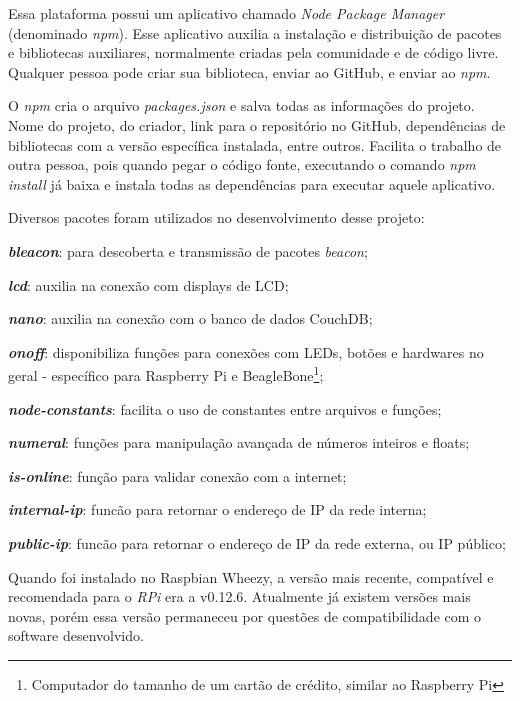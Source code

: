 \documentclass[
		12pt,				%
		openright,			%
		oneside,			%
		a4paper,			%
		chapter=TITLE,		%
		english,			%
		brazil				%
	]{abntex2}
\begin{document}
Essa plataforma possui um aplicativo chamado \textit{Node Package Manager} (denominado \textit{npm}). Esse aplicativo auxilia a instalação e distribuição de pacotes e bibliotecas auxiliares, normalmente criadas pela comunidade e de código livre. Qualquer pessoa pode criar sua biblioteca, enviar ao GitHub, e enviar ao \textit{npm}.

O \textit{npm} cria o arquivo \textit{packages.json} e salva todas as informações do projeto. Nome do projeto, do criador, link para o repositório no GitHub, dependências de bibliotecas com a versão específica instalada, entre outros. Facilita o trabalho de outra pessoa, pois quando pegar o código fonte, executando o comando \textit{npm install} já baixa e instala todas as dependências para executar aquele aplicativo.

Diversos pacotes foram utilizados no desenvolvimento desse projeto:

\begin{alineas}
	\item \textbf{\textit{bleacon}}: para descoberta e transmissão de pacotes \textit{beacon};
	\item \textbf{\textit{lcd}}: auxilia na conexão com displays de LCD;
	\item \textbf{\textit{nano}}: auxilia na conexão com o banco de dados CouchDB;
	\item \textbf{\textit{onoff}}: disponibiliza funções para conexões com LEDs, botões e hardwares no geral - específico para Raspberry Pi e BeagleBone\footnote{Computador do tamanho de um cartão de crédito, similar ao Raspberry Pi};
	\item \textbf{\textit{node-constants}}: facilita o uso de constantes entre arquivos e funções;
	\item \textbf{\textit{numeral}}: funções para manipulação avançada de números inteiros e floats;
	\item \textbf{\textit{is-online}}: função para validar conexão com a internet;
	\item \textbf{\textit{internal-ip}}: funcão para retornar o endereço de IP da rede interna;
	\item \textbf{\textit{public-ip}}: funcão para retornar o endereço de IP da rede externa, ou IP público;
\end{alineas}

Quando foi instalado no Raspbian Wheezy, a versão mais recente, compatível e recomendada para o \textit{RPi} era a v0.12.6. Atualmente já existem versões mais novas, porém essa versão permaneceu por questões de compatibilidade com o software desenvolvido.
\end{document}
